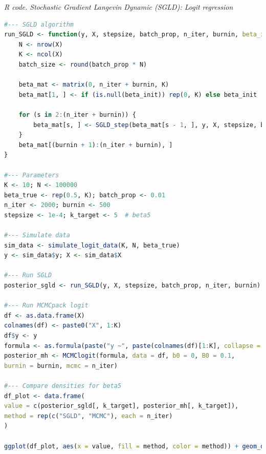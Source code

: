 \begin{tcolorbox}[enhanced,width=4.67in,center upper,
	fontupper=\large\bfseries,drop shadow southwest,sharp corners]
	\textit{R code. Stochastic Gradient Langevin Dynamic (SGLD): Logit regression}
	\begin{VF}
		\begin{lstlisting}[language=R]
#--- SGLD algorithm
run_SGLD <- function(y, X, stepsize, batch_prop, n_iter, burnin, beta_init = NULL){
	N <- nrow(X)
	K <- ncol(X)
	batch_size <- round(batch_prop * N)
	
	beta_mat <- matrix(0, n_iter + burnin, K)
	beta_mat[1, ] <- if (is.null(beta_init)) rep(0, K) else beta_init
	
	for (s in 2:(n_iter + burnin)) {
		beta_mat[s, ] <- SGLD_step(beta_mat[s - 1, ], y, X, stepsize, batch_size)
	}
	beta_mat[(burnin + 1):(n_iter + burnin), ]
}

#--- Parameters
K <- 10; N <- 100000
beta_true <- rep(0.5, K); batch_prop <- 0.01
n_iter <- 2000; burnin <- 500
stepsize <- 1e-4; k_target <- 5  # beta5

#--- Simulate data
sim_data <- simulate_logit_data(K, N, beta_true)
y <- sim_data$y; X <- sim_data$X

#--- Run SGLD
posterior_sgld <- run_SGLD(y, X, stepsize, batch_prop, n_iter, burnin)

#--- Run MCMCpack logit
df <- as.data.frame(X)
colnames(df) <- paste0("X", 1:K)
df$y <- y
formula <- as.formula(paste("y ~", paste(colnames(df)[1:K], collapse = " + "), "-1"))
posterior_mh <- MCMClogit(formula, data = df, b0 = 0, B0 = 0.1,
burnin = burnin, mcmc = n_iter)

#--- Compare densities for beta5
df_plot <- data.frame(
value = c(posterior_sgld[, k_target], posterior_mh[, k_target]),
method = rep(c("SGLD", "MCMC"), each = n_iter)
)

ggplot(df_plot, aes(x = value, fill = method, color = method)) + geom_density(alpha = 0.4) + geom_vline(xintercept = beta_true[k_target], linetype = "dashed", color = "black") + labs(title = expression(paste("Posterior density of ", beta[5])), x = expression(beta[5]), y = "Density") + theme_minimal()
\end{lstlisting}
	\end{VF}
\end{tcolorbox}

